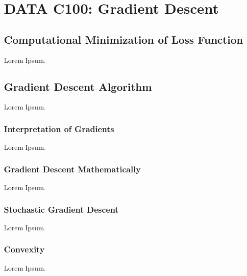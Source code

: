 \chapter{DATA C100: Gradient Descent}

\section{Computational Minimization of Loss Function}
Lorem Ipsum.

\section{Gradient Descent Algorithm}
Lorem Ipsum.

\subsection{Interpretation of Gradients}
Lorem Ipsum.

\subsection{Gradient Descent Mathematically}
Lorem Ipsum.

\subsection{Stochastic Gradient Descent}
Lorem Ipsum.

\subsection{Convexity}
Lorem Ipsum.
